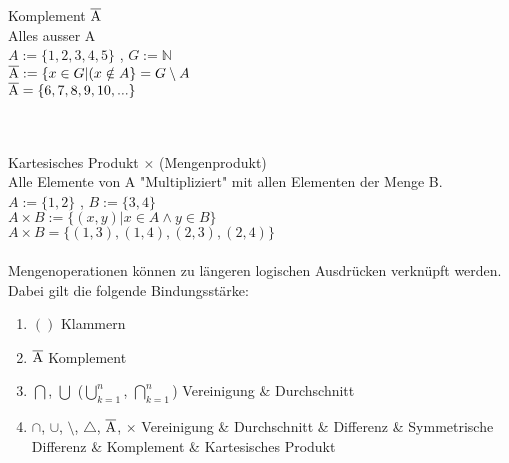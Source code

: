\documentclass[../gruppenarbeit_1.tex]{subfiles}
\begin{document}
Komplement $\overline{\rm A}$\\
Alles ausser A\\
$A := \{1,2,3,4,5\}$ , $G := \mathbb{N}$\\
$\overline{\rm A} := \{x \in G | (x \notin A\} = G \setminus A$\\
$\overline{\rm A} = \{6,7,8,9,10,...\}$\\
\\

\\

Kartesisches Produkt $\times$ (Mengenprodukt)\\
Alle Elemente von A "Multipliziert" mit allen Elementen der Menge B.\\
$A := \{1,2\}$ , $B := \{3,4\}$\\
$A \times B := \{(x,y) | x \in A \wedge y \in B\}$\\
$A \times B = \{(1,3),(1,4),(2,3),(2,4)\}$\\
\\

Mengenoperationen können zu längeren logischen Ausdrücken verknüpft werden.\\

Dabei gilt die folgende Bindungsstärke:

\begin{enumerate}
  \item $( )$ \hspace{15.5mm} Klammern
  \item $\overline{\rm A}$ \hspace{8mm} Komplement
  \item $\bigcap$, $\bigcup$ ($\bigcup \limits_{k=1}^n$, $\bigcap \limits_{k=1}^n$) \hspace{1mm} Vereinigung \& Durchschnitt
  \item $\cap$, $\cup$, $\setminus$, $\triangle$, $\overline{\rm A}$, $\times$ \hspace{8mm} Vereinigung \& Durchschnitt \& Differenz \& Symmetrische Differenz \& Komplement \& Kartesisches Produkt
\end{enumerate}
\end{document}
